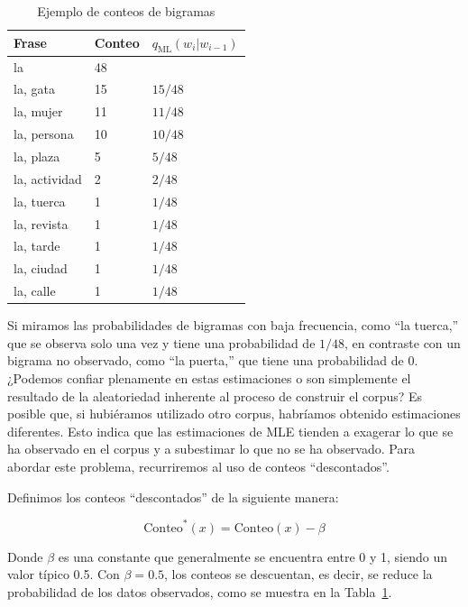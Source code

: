 \begin{table}[h]
    \centering
    \begin{tabular}{|l|l|l|}\hline
        \textbf{Frase} & \textbf{Conteo} & \textbf{$q_{\text{ML}}(w_i | w_{i-1})$} \\
        \hline
        la & 48 & \\
        la, gata & 15 & $15/48$ \\
        la, mujer & 11 & $11/48$ \\
        la, persona & 10 & $10/48$ \\
        la, plaza & 5 & $5/48$ \\
        la, actividad & 2 & $2/48$ \\
        la, tuerca & 1 & $1/48$ \\
        la, revista & 1 & $1/48$ \\
        la, tarde & 1 & $1/48$ \\
        la, ciudad & 1 & $1/48$ \\
        la, calle & 1 & $1/48$ \\ \hline
    \end{tabular}\caption{Ejemplo de conteos de bigramas}\label{tab:plm_ej}
\end{table}

Si miramos las probabilidades de bigramas con baja frecuencia, como ``la tuerca,'' que se observa solo una vez y tiene una probabilidad de $1/48$, en contraste con un bigrama no observado, como ``la puerta,'' que tiene una probabilidad de $0$. ¿Podemos confiar plenamente en estas estimaciones o son simplemente el resultado de la aleatoriedad inherente al proceso de construir el corpus? Es posible que, si hubiéramos utilizado otro corpus, habríamos obtenido estimaciones diferentes. Esto indica que las estimaciones de MLE tienden a exagerar lo que se ha observado en el corpus y a subestimar lo que no se ha observado. Para abordar este problema, recurriremos al uso de conteos ``descontados''.

\begin{definition}
Definimos los conteos ``descontados'' de la siguiente manera:

\[
\text{Conteo}^*(x) = \text{Conteo}(x) - \beta
\]
\end{definition}



Donde $\beta$ es una constante que generalmente se encuentra entre 0 y 1, siendo un valor típico 0.5. Con $\beta=0.5$, los conteos se descuentan, es decir, se reduce la probabilidad de los datos observados, como se muestra en la Tabla~\ref{tab:plm_ej}.

